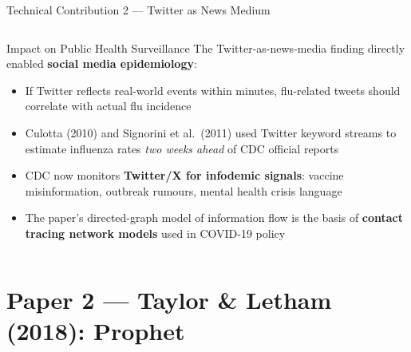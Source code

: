\documentclass[aspectratio=169,10pt]{beamer}
\begin{document}
\begin{frame}{Technical Contribution 2 — Twitter as News Medium}
\begin{columns}[T]
      \begin{block}{Impact on Public Health Surveillance}
        The Twitter-as-news-media finding directly enabled
        \textbf{social media epidemiology}:
        \begin{itemize}
          \item If Twitter reflects real-world events within minutes,
                flu-related tweets should correlate with actual
                flu incidence
          \item Culotta (2010) and Signorini et al.\ (2011) used
                Twitter keyword streams to estimate influenza rates
                \emph{two weeks ahead} of CDC official reports
          \item CDC now monitors \textbf{Twitter/X for infodemic signals}:
                vaccine misinformation, outbreak rumours,
                mental health crisis language
          \item The paper's directed-graph model of information flow
                is the basis of \textbf{contact tracing network models}
                used in COVID-19 policy
        \end{itemize}
      \end{block}
  \end{columns}
\end{frame}

\section{Paper 2 — Taylor \& Letham (2018): Prophet}
\end{document}
